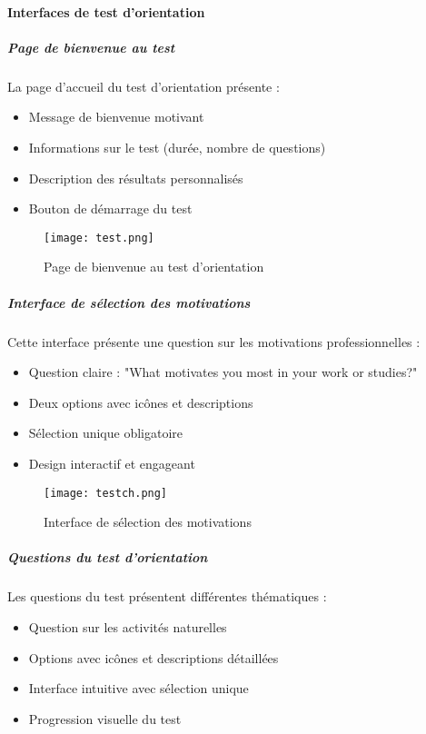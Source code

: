 \documentclass[12pt,a4paper]{report}
\begin{document}
\paragraph{Interfaces de test d'orientation}

\subparagraph{Page de bienvenue au test}

La page d'accueil du test d'orientation présente :

\begin{itemize}
    \item Message de bienvenue motivant
    \item Informations sur le test (durée, nombre de questions)
    \item Description des résultats personnalisés
    \item Bouton de démarrage du test
\end{itemize}

\begin{figure}[H]
\centering
\texttt{[image: test.png]}
\caption{Page de bienvenue au test d'orientation}
\label{fig:welcome-test}
\end{figure}

\subparagraph{Interface de sélection des motivations}

Cette interface présente une question sur les motivations professionnelles :

\begin{itemize}
    \item Question claire : "What motivates you most in your work or studies?"
    \item Deux options avec icônes et descriptions
    \item Sélection unique obligatoire
    \item Design interactif et engageant
\end{itemize}

\begin{figure}[H]
\centering
\texttt{[image: testch.png]}
\caption{Interface de sélection des motivations}
\label{fig:test-choix}
\end{figure}

\subparagraph{Questions du test d'orientation}

Les questions du test présentent différentes thématiques :

\begin{itemize}
    \item Question sur les activités naturelles
    \item  Options avec icônes et descriptions détaillées
    \item Interface intuitive avec sélection unique
    \item Progression visuelle du test
\end{itemize}
\end{document}

